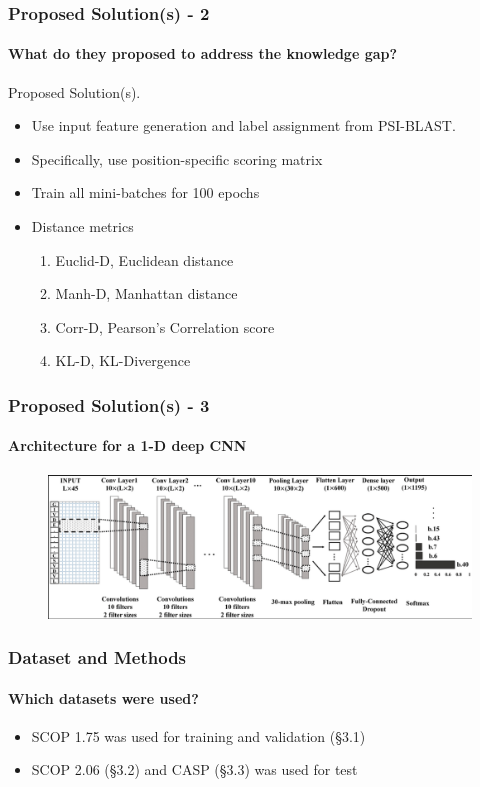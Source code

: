 \documentclass[xcolor={usenames,dvipsnames},hyperref={hyperindex,bookmarks}]{beamer}
\begin{document}
\frame
{
	\frametitle{Proposed Solution(s) - 2}
	\framesubtitle{What do they proposed to address the knowledge gap?}

	Proposed Solution(s).
	\begin{itemize}
	\item Use input feature generation and label assignment from PSI-BLAST.
	\item Specifically, use position-specific scoring matrix
	\item Train all mini-batches for 100 epochs
	\item Distance metrics
		\begin{enumerate} 
		\item Euclid-D, Euclidean distance
		\item Manh-D, Manhattan distance
		\item Corr-D, Pearson's Correlation score
		\item KL-D, KL-Divergence
		\end{enumerate}
	\end{itemize}
}







\frame
{
	\frametitle{Proposed Solution(s) - 3}
	\framesubtitle{Architecture for a 1-D deep CNN}


	\begin{figure}[h]
	\centering 
	\includegraphics[height=1.5in]{./pics/1-d-cnn-architecture}
	\label{fig:1DdeepCNNarch}
	\end{figure}
}









\frame
{
	\frametitle{Dataset and Methods}
	\framesubtitle{Which datasets were used?}

	\begin{itemize}
	\item SCOP 1.75 was used for training and validation (\S3.1)
	\item SCOP 2.06 (\S3.2) and CASP (\S3.3) was used for test
	\end{itemize}
}
\end{document}
